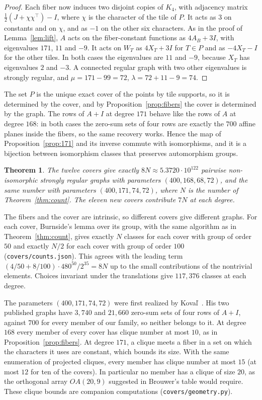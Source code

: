 \documentclass[11pt]{amsart}
\newtheorem{theorem}{Theorem}[section]
\theoremstyle{remark}
\begin{document}
\begin{proof}
Each fiber now induces two disjoint copies of $K_4$, with adjacency matrix $\tfrac12(J+\chi\chi^{\top})-I$, where $\chi$ is the character of the tile of $P$. It acts as $3$ on constants and on $\chi$, and as $-1$ on the other six characters. As in the proof of Lemma~\ref{lem:lift}, $A$ acts on the fiber-constant functions as $4A_B+3I$, with eigenvalues $171$, $11$ and $-9$. It acts on $W_T$ as $4X_T+3I$ for $T\in P$ and as $-4X_T-I$ for the other tiles. In both cases the eigenvalues are $11$ and $-9$, because $X_T$ has eigenvalues $2$ and $-3$. A connected regular graph with two other eigenvalues is strongly regular, and $\mu=171-99=72$, $\lambda=72+11-9=74$.
\end{proof}

The set $P$ is the unique exact cover of the points by tile supports, so it is determined by the cover, and by Proposition~\ref{prop:fibers} the cover is determined by the graph. The rows of $A+I$ at degree $171$ behave like the rows of $A$ at degree $168$: in both cases the zero-sum sets of four rows are exactly the $700$ affine planes inside the fibers, so the same recovery works. Hence the map of Proposition~\ref{prop:171} and its inverse commute with isomorphisms, and it is a bijection between isomorphism classes that preserves automorphism groups.

\begin{theorem}\label{thm:count12}
The twelve covers give exactly $8N\approx5.3720\cdot10^{122}$ pairwise non-isomorphic strongly regular graphs with parameters $(400,168,68,72)$, and the same number with parameters $(400,171,74,72)$, where $N$ is the number of Theorem~\ref{thm:count}. The eleven new covers contribute $7N$ at each degree.
\end{theorem}

The fibers and the cover are intrinsic, so different covers give different graphs. For each cover, Burnside's lemma over its group, with the same algorithm as in Theorem~\ref{thm:count}, gives exactly $N$ classes for each cover with group of order $50$ and exactly $N/2$ for each cover with group of order $100$ (\texttt{covers/counts.json}). This agrees with the leading term $(4/50+8/100)\cdot480^{50}/2^{35}=8N$ up to the small contributions of the nontrivial elements. Choices invariant under the translations give $117{,}376$ classes at each degree.

The parameters $(400,171,74,72)$ were first realized by Kova\v{l}~\cite{KovMO}. His two published graphs have $3{,}740$ and $21{,}660$ zero-sum sets of four rows of $A+I$, against $700$ for every member of our family, so neither belongs to it. At degree $168$ every member of every cover has clique number at most $10$, as in Proposition~\ref{prop:fibers}. At degree $171$, a clique meets a fiber in a set on which the characters it uses are constant, which bounds its size. With the same enumeration of projected cliques, every member has clique number at most $15$ (at most $12$ for ten of the covers). In particular no member has a clique of size $20$, as the orthogonal array $OA(20,9)$ suggested in Brouwer's table would require. These clique bounds are companion computations (\texttt{covers/geometry.py}).
\end{document}
